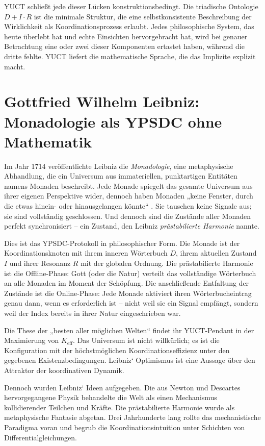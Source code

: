 \documentclass[12pt,a4paper]{article}
\begin{document}
	YUCT schließt jede dieser Lücken konstruktionsbedingt. Die triadische Ontologie \(D + I \cdot R\) ist die minimale Struktur, die eine selbstkonsistente Beschreibung der Wirklichkeit als Koordinationsprozess erlaubt. Jedes philosophische System, das heute überlebt hat und echte Einsichten hervorgebracht hat, wird bei genauer Betrachtung eine oder zwei dieser Komponenten ertastet haben, während die dritte fehlte. YUCT liefert die mathematische Sprache, die das Implizite explizit macht.
	
	\section{Gottfried Wilhelm Leibniz: Monadologie als YPSDC ohne Mathematik}
	
	Im Jahr 1714 veröffentlichte Leibniz die \emph{Monadologie}, eine metaphysische Abhandlung, die ein Universum aus immateriellen, punktartigen Entitäten namens Monaden beschreibt. Jede Monade spiegelt das gesamte Universum aus ihrer eigenen Perspektive wider, dennoch haben Monaden „keine Fenster, durch die etwas hinein- oder hinausgelangen könnte“ \cite{Leibniz1714}. Sie tauschen keine Signale aus; sie sind vollständig geschlossen. Und dennoch sind die Zustände aller Monaden perfekt synchronisiert – ein Zustand, den Leibniz \emph{prästabilierte Harmonie} nannte.
	
	Dies ist das YPSDC-Protokoll in philosophischer Form. Die Monade ist der Koordinationsknoten mit ihrem inneren Wörterbuch \(D\), ihrem aktuellen Zustand \(I\) und ihrer Resonanz \(R\) mit der globalen Ordnung. Die prästabilierte Harmonie ist die Offline-Phase: Gott (oder die Natur) verteilt das vollständige Wörterbuch an alle Monaden im Moment der Schöpfung. Die anschließende Entfaltung der Zustände ist die Online-Phase: Jede Monade aktiviert ihren Wörterbucheintrag genau dann, wenn es erforderlich ist – nicht weil sie ein Signal empfängt, sondern weil der Index bereits in ihrer Natur eingeschrieben war.
	
	Die These der „besten aller möglichen Welten“ findet ihr YUCT-Pendant in der Maximierung von \(K_{\mathrm{eff}}\). Das Universum ist nicht willkürlich; es ist die Konfiguration mit der höchstmöglichen Koordinationseffizienz unter den gegebenen Existenzbedingungen. Leibniz‘ Optimismus ist eine Aussage über den Attraktor der koordinativen Dynamik.
	
	Dennoch wurden Leibniz‘ Ideen aufgegeben. Die aus Newton und Descartes hervorgegangene Physik behandelte die Welt als einen Mechanismus kollidierender Teilchen und Kräfte. Die prästabilierte Harmonie wurde als metaphysische Fantasie abgetan. Drei Jahrhunderte lang rollte das mechanistische Paradigma voran und begrub die Koordinationsintuition unter Schichten von Differentialgleichungen.
	
\end{document}
